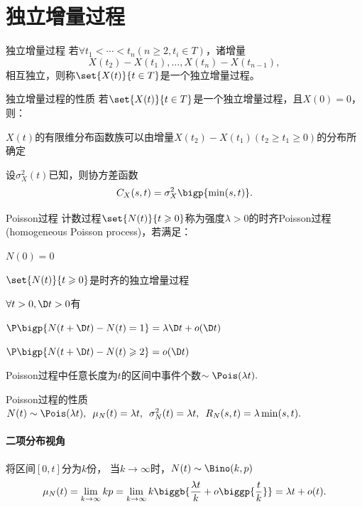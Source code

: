 \section{独立增量过程}
\begin{definition}{独立增量过程}{}
	若$\forall t_1<\cdots<t_n(n\geqslant2, t_i\in T)$，诸增量
	\[
		X(t_2)-X(t_1),\ldots,X(t_n)-X(t_{n-1}),
	\]
	相互独立，则称$\set{X(t)}{t\in T}$是一个独立增量过程。
\end{definition}
\begin{theorem}{独立增量过程的性质}{}
	若$\set{X(t)}{t\in T}$是一个独立增量过程，且$X(0)=0$，则：
	\begin{compactitem}
		\item $X(t)$的有限维分布函数族可以由增量$X(t_2)-X(t_1)(t_2\geqslant t_1\geqslant 0)$的分布所确定
		\item 设$\sigma^2_X(t)$已知，则协方差函数
		\begin{equation}
			C_X(s,t)=\sigma^2_X\bigp{\min(s,t)}.
		\end{equation}
	\end{compactitem}
\end{theorem}
\begin{definition}{Poisson过程}{}
	计数过程$\set{N(t)}{t\geqslant 0}$称为强度$\lambda>0$的时齐Poisson过程(homogeneous Poisson process)，若满足：
	\begin{compactenum}
		\item $N(0)=0$
		\item $\set{N(t)}{t\geqslant 0}$是时齐的独立增量过程
		\item $\forall t>0,\D t>0$有
		\begin{compactitem}
			\item $\P\bigp{N(t+\D t)-N(t)=1}=\lambda\D t+o(\D t)$
			\item $\P\bigp{N(t+\D t)-N(t)\geqslant 2}=o(\D t)$
		\end{compactitem}
	\end{compactenum}
\end{definition}
Poisson过程中任意长度为$ t $的区间中事件个数$\sim\Pois(\lambda t).$
\begin{theorem}{Poisson过程的性质}{}
	$N(t)\sim\Pois(\lambda t),\enspace\mu_N(t)=\lambda t,\enspace\sigma^2_N(t)=\lambda t,\enspace R_N(s,t)=\lambda\min(s,t).$%
\end{theorem}
\paragraph{二项分布视角}
将区间$ [0, t] $分为$ k $份，
当$k\to\infty$时，$N(t)\sim\Bino(k,p)$
\[
	\mu_N(t)=\lim_{k\to\infty}kp=\lim_{k\to\infty}k\biggb{\frac{\lambda t}k+o\biggp{\frac tk}}=\lambda t+o(t).
\]

